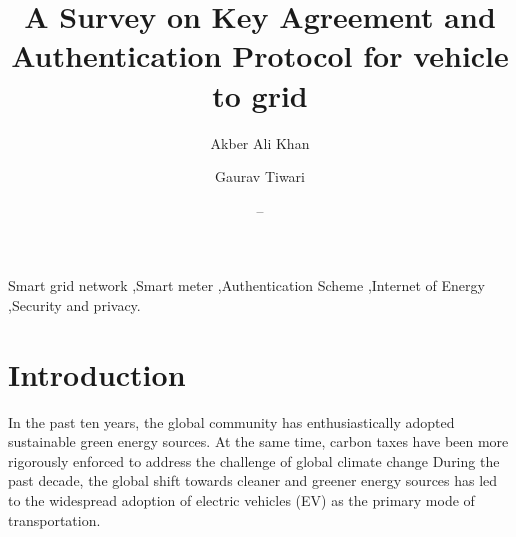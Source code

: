 \documentclass[3p,times,onecolumn]{elsarticle}
\begin{document}
\begin{frontmatter}


\title{ A Survey on Key Agreement and Authentication Protocol for vehicle to grid  }










\author[label1]{Akber Ali Khan}
\author[label1]{Gaurav Tiwari}
\author[label1]{--}
\address[label1]{Department of Applied Sciences and Humanities, IIMT College of Engineering, Greater Noida, Uttar Pradesh-201310, India\\
E-mail: cs.akberkhan@gmail.com,cs.gauravtiwari@gmail.com, ashish143maurya143@gmail.com  and riyatiwari0567@gmail.com}
\begin{abstract}




\end{abstract}


\begin{keyword} 
Smart grid network \sep Smart meter \sep Authentication Scheme \sep Internet of Energy \sep Security and privacy.
\end{keyword}
\end{frontmatter}


\section{Introduction} In the past ten years, the global community has enthusiastically adopted sustainable green energy sources. At the same time, carbon taxes have been more rigorously enforced to address the challenge of global climate change\cite{GT1} During the past decade, the global shift towards cleaner and greener energy sources has led to the widespread adoption of electric vehicles (EV) as the primary mode of transportation.
\end{document}
